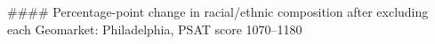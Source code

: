 #### Percentage-point change in racial/ethnic composition after excluding each Geomarket: Philadelphia, PSAT score 1070–1180

